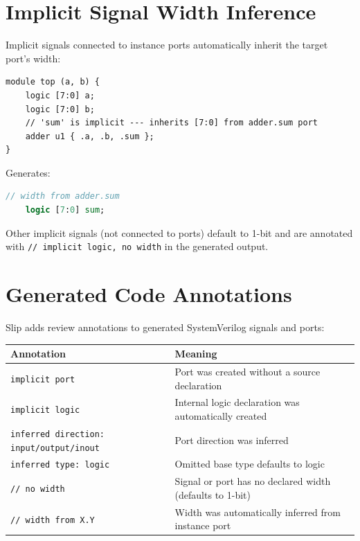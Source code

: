 \documentclass[lang=en,11pt]{elegantbook}
\newcommand{\code}[1]{\texttt{#1}}
\begin{document}
\section{Implicit Signal Width Inference}

Implicit signals connected to instance ports automatically inherit the target port's width:

\begin{lstlisting}[language=Slip]
module top (a, b) {
    logic [7:0] a;
    logic [7:0] b;
    // 'sum' is implicit --- inherits [7:0] from adder.sum port
    adder u1 { .a, .b, .sum };
}
\end{lstlisting}

Generates:

\begin{lstlisting}[language=SystemVerilog]
    // width from adder.sum
    logic [7:0] sum;
\end{lstlisting}

Other implicit signals (not connected to ports) default to 1-bit and are annotated with \code{// implicit logic, no width} in the generated output.

\section{Generated Code Annotations}

Slip adds review annotations to generated SystemVerilog signals and ports:

\begin{table}[htbp]
\centering
\begin{tabular}{ll}
\toprule
\textbf{Annotation} & \textbf{Meaning} \\
\midrule
\code{implicit port} & Port was created without a source declaration \\
\code{implicit logic} & Internal logic declaration was automatically created \\
\code{inferred direction: input/output/inout} & Port direction was inferred \\
\code{inferred type: logic} & Omitted base type defaults to logic \\
\code{// no width} & Signal or port has no declared width (defaults to 1-bit) \\
\code{// width from X.Y} & Width was automatically inferred from instance port \\
\bottomrule
\end{tabular}
\end{table}
\end{document}
